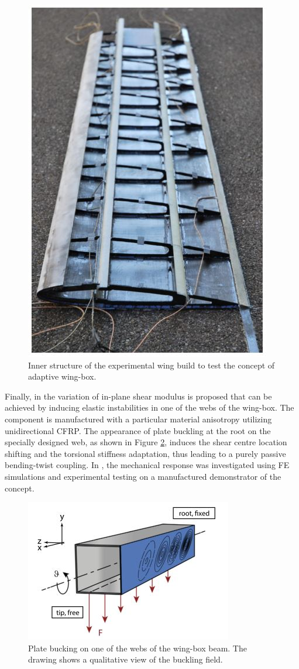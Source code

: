   \begin{figure}[!htpb]
    \centering
    \includegraphics[width=0.5 \textwidth]{figures/state-of-the-art/raither-demonstrator}
    \caption[Inner structure of the experimental wing build to test the concept of adaptive wing-box]{Inner structure of the experimental wing build to test the concept of adaptive wing-box. \cite{Raither2013}}\label{fig:raither-demonstrator}
  \end{figure}

  Finally, in \cite{Runkel2016} the variation of in-plane shear modulus is proposed that can be achieved by inducing elastic instabilities in one of the webs of the wing-box. The component is manufactured with a particular material anisotropy utilizing unidirectional CFRP. The appearance of plate buckling at the root on the specially designed web, as shown in Figure \ref{fig:plate-buckling}, induces the shear centre location shifting and the torsional stiffness adaptation, thus leading to a purely passive bending-twist coupling. In \cite{Andreas2015}, the mechanical response was investigated using FE simulations and experimental testing on a manufactured demonstrator of the concept.

  \begin{figure}[!htpb]
    \centering
    \includegraphics[width=0.6 \textwidth]{figures/state-of-the-art/plate-buckling}
    \caption[Plate bucking on one of the webs of the wing-box beam]{Plate bucking on one of the webs of the wing-box beam. The drawing shows a qualitative view of the buckling field. \cite{Runkel2016}}\label{fig:plate-buckling}
  \end{figure}

